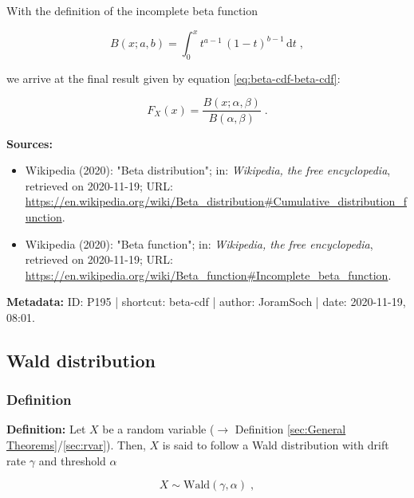 \documentclass[a4paper,12pt,twoside]{book}
\begin{document}
With the definition of the incomplete beta function

\begin{equation} \label{eq:beta-cdf-inc-beta-fct}
B(x;a,b) = \int_{0}^{x} t^{a-1} \, (1-t)^{b-1} \, \mathrm{d}t \; ,
\end{equation}

we arrive at the final result given by equation \eqref{eq:beta-cdf-beta-cdf}:

\begin{equation} \label{eq:beta-cdf-beta-cdf-qed}
F_X(x) = \frac{B(x; \alpha, \beta)}{B(\alpha, \beta)} \; .
\end{equation}


\vspace{1em}
\textbf{Sources:}
\begin{itemize}
\item Wikipedia (2020): "Beta distribution"; in: \textit{Wikipedia, the free encyclopedia}, retrieved on 2020-11-19; URL: \url{https://en.wikipedia.org/wiki/Beta_distribution#Cumulative_distribution_function}.
\item Wikipedia (2020): "Beta function"; in: \textit{Wikipedia, the free encyclopedia}, retrieved on 2020-11-19; URL: \url{https://en.wikipedia.org/wiki/Beta_function#Incomplete_beta_function}.
\end{itemize}


\vspace{1em}
\textbf{Metadata:} ID: P195 | shortcut: beta-cdf | author: JoramSoch | date: 2020-11-19, 08:01.
\vspace{1em}



\subsection{Wald distribution}

\subsubsection[\textit{Definition}]{Definition} \label{sec:wald}
\setcounter{equation}{0}

\textbf{Definition:} Let $X$ be a random variable ($\rightarrow$ Definition \ref{sec:General Theorems}/\ref{sec:rvar}). Then, $X$ is said to follow a Wald distribution with drift rate $\gamma$ and threshold $\alpha$

\begin{equation} \label{eq:wald-wald}
X \sim \mathrm{Wald}(\gamma, \alpha) \; ,
\end{equation}
\end{document}
